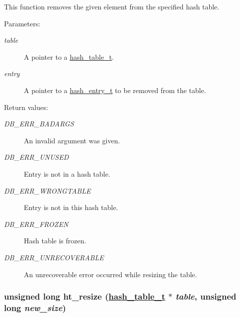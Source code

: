 This function removes the given element from the specified hash table.\begin{Desc}
\item[Parameters: ]\par
\begin{description}
\item[{\em 
table}]A pointer to a \hyperlink{group__dbprim__hash_a0}{hash\_\-table\_\-t}. \item[{\em 
entry}]A pointer to a \hyperlink{group__dbprim__hash_a1}{hash\_\-entry\_\-t} to be removed from the table.\end{description}
\end{Desc}
\begin{Desc}
\item[Return values: ]\par
\begin{description}
\item[{\em 
DB\_\-ERR\_\-BADARGS}]An invalid argument was given. \item[{\em 
DB\_\-ERR\_\-UNUSED}]Entry is not in a hash table. \item[{\em 
DB\_\-ERR\_\-WRONGTABLE}]Entry is not in this hash table. \item[{\em 
DB\_\-ERR\_\-FROZEN}]Hash table is frozen. \item[{\em 
DB\_\-ERR\_\-UNRECOVERABLE}]An unrecoverable error occurred while resizing the table. \end{description}
\end{Desc}
\hypertarget{group__dbprim__hash_a13}{
\subsubsection[ht\_\-resize]{\setlength{\rightskip}{0pt plus 5cm}unsigned long ht\_\-resize (\hyperlink{group__dbprim__hash_a0}{hash\_\-table\_\-t} $\ast$ {\em table}, unsigned long {\em new\_\-size})}}
\label{group__dbprim__hash_a13}


